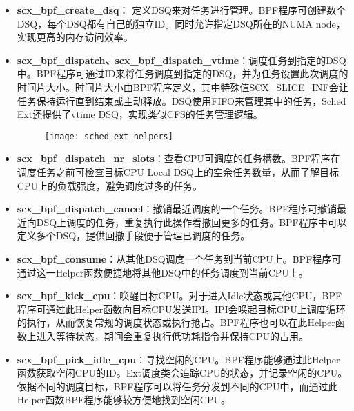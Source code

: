 \begin{itemize}

    \item \textbf{scx\_bpf\_create\_dsq}： 定义DSQ来对任务进行管理。BPF程序可创建数个DSQ，每个DSQ都有自己的独立ID。同时允许指定DSQ所在的NUMA node，实现更高的内存访问效率。

    \item \textbf{scx\_bpf\_dispatch、scx\_bpf\_dispatch\_vtime}：调度任务到指定的DSQ中。BPF程序可通过ID来将任务调度到指定的DSQ，并为任务设置此次调度的时间片大小。时间片大小由BPF程序定义，其中特殊值SCX_SLICE_INF会让任务保持运行直到结束或主动释放。DSQ使用FIFO来管理其中的任务，Sched Ext还提供了vtime DSQ，实现类似CFS的任务管理逻辑。

    \begin{figure}[!htbp]
        \centering
        \texttt{[image: sched\_ext\_helpers]}
        \label{fig:sched_ext_helpers}
    \end{figure}
    
    \item \textbf{scx\_bpf\_dispatch\_nr\_slots}：查看CPU可调度的任务槽数。BPF程序在调度任务之前可检查目标CPU Local DSQ上的空余任务数量，从而了解目标CPU上的负载强度，避免调度过多的任务。

    \item \textbf{scx\_bpf\_dispatch\_cancel}：撤销最近调度的一个任务。BPF程序可撤销最近向DSQ上调度的任务，重复执行此操作看撤回更多的任务。BPF程序中可以定义多个DSQ，提供回撤手段便于管理已调度的任务。
    
    \item \textbf{scx\_bpf\_consume}：从其他DSQ调度一个任务到当前CPU上。BPF程序可通过这一Helper函数便捷地将其他DSQ中的任务调度到当前CPU上。

    \item \textbf{scx\_bpf\_kick\_cpu}：唤醒目标CPU。对于进入Idle状态或其他CPU，BPF程序可通过此Helper函数向目标CPU发送IPI。IPI会唤起目标CPU上调度循环的执行，从而恢复常规的调度状态或执行抢占。BPF程序也可以在此Helper函数上进入等待状态，期间会重复执行低功耗指令并保持CPU的占用。

    \item \textbf{scx\_bpf\_pick\_idle\_cpu}：寻找空闲的CPU。BPF程序能够通过此Helper函数获取空闲CPU的ID。Ext调度类会追踪CPU的状态，并记录空闲的CPU。依据不同的调度目标，BPF程序可以将任务分发到不同的CPU中，而通过此Helper函数BPF程序能够较方便地找到空闲CPU。

\end{itemize}


